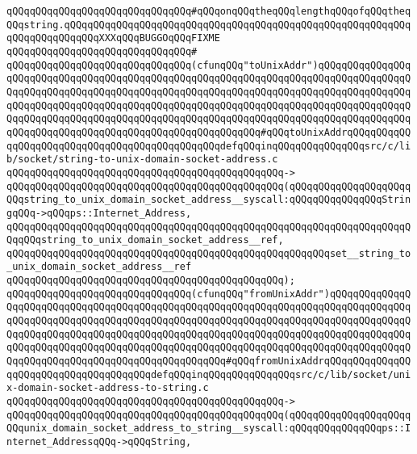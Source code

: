 \verb|qQQqqQQqqQQqqQQqqQQqqQQqqQQqqQQq#qQQqonqQQqtheqQQqlengthqQQqofqQQqtheqQQqstring.qQQqqQQqqQQqqQQqqQQqqQQqqQQqqQQqqQQqqQQqqQQqqQQqqQQqqQQqqQQqqQQqqQQqqQQqqQQqXXXqQQqBUGGOqQQqFIXME|\newline
\verb|qQQqqQQqqQQqqQQqqQQqqQQqqQQqqQQq#|\newline
\newline
\verb|qQQqqQQqqQQqqQQqqQQqqQQqqQQqqQQq(cfunqQQq"toUnixAddr")qQQqqQQqqQQqqQQqqQQqqQQqqQQqqQQqqQQqqQQqqQQqqQQqqQQqqQQqqQQqqQQqqQQqqQQqqQQqqQQqqQQqqQQqqQQqqQQqqQQqqQQqqQQqqQQqqQQqqQQqqQQqqQQqqQQqqQQqqQQqqQQqqQQqqQQqqQQqqQQqqQQqqQQqqQQqqQQqqQQqqQQqqQQqqQQqqQQqqQQqqQQqqQQqqQQqqQQqqQQqqQQqqQQqqQQqqQQqqQQqqQQqqQQqqQQqqQQqqQQqqQQqqQQqqQQqqQQqqQQqqQQqqQQqqQQqqQQqqQQqqQQqqQQqqQQqqQQqqQQqqQQqqQQqqQQqqQQqqQQq#qQQqtoUnixAddrqQQqqQQqqQQqqQQqqQQqqQQqqQQqqQQqqQQqqQQqqQQqqQQqdefqQQqinqQQqqQQqqQQqqQQqsrc/c/lib/socket/string-to-unix-domain-socket-address.c|\newline
\verb|qQQqqQQqqQQqqQQqqQQqqQQqqQQqqQQqqQQqqQQqqQQqqQQq->|\newline
\verb|qQQqqQQqqQQqqQQqqQQqqQQqqQQqqQQqqQQqqQQqqQQqqQQq(qQQqqQQqqQQqqQQqqQQqqQQqstring_to_unix_domain_socket_address__syscall:qQQqqQQqqQQqqQQqStringqQQq->qQQqps::Internet_Address,|\newline
\verb|qQQqqQQqqQQqqQQqqQQqqQQqqQQqqQQqqQQqqQQqqQQqqQQqqQQqqQQqqQQqqQQqqQQqqQQqqQQqstring_to_unix_domain_socket_address__ref,|\newline
\verb|qQQqqQQqqQQqqQQqqQQqqQQqqQQqqQQqqQQqqQQqqQQqqQQqqQQqqQQqset__string_to_unix_domain_socket_address__ref|\newline
\verb|qQQqqQQqqQQqqQQqqQQqqQQqqQQqqQQqqQQqqQQqqQQqqQQq);|\newline
\newline
\verb|qQQqqQQqqQQqqQQqqQQqqQQqqQQqqQQq(cfunqQQq"fromUnixAddr")qQQqqQQqqQQqqQQqqQQqqQQqqQQqqQQqqQQqqQQqqQQqqQQqqQQqqQQqqQQqqQQqqQQqqQQqqQQqqQQqqQQqqQQqqQQqqQQqqQQqqQQqqQQqqQQqqQQqqQQqqQQqqQQqqQQqqQQqqQQqqQQqqQQqqQQqqQQqqQQqqQQqqQQqqQQqqQQqqQQqqQQqqQQqqQQqqQQqqQQqqQQqqQQqqQQqqQQqqQQqqQQqqQQqqQQqqQQqqQQqqQQqqQQqqQQqqQQqqQQqqQQqqQQqqQQqqQQqqQQqqQQqqQQqqQQqqQQqqQQqqQQqqQQqqQQqqQQqqQQqqQQqqQQqqQQq#qQQqfromUnixAddrqQQqqQQqqQQqqQQqqQQqqQQqqQQqqQQqqQQqqQQqdefqQQqinqQQqqQQqqQQqqQQqsrc/c/lib/socket/unix-domain-socket-address-to-string.c|\newline
\verb|qQQqqQQqqQQqqQQqqQQqqQQqqQQqqQQqqQQqqQQqqQQqqQQq->|\newline
\verb|qQQqqQQqqQQqqQQqqQQqqQQqqQQqqQQqqQQqqQQqqQQqqQQq(qQQqqQQqqQQqqQQqqQQqqQQqunix_domain_socket_address_to_string__syscall:qQQqqQQqqQQqqQQqps::Internet_AddressqQQq->qQQqString,|\newline

